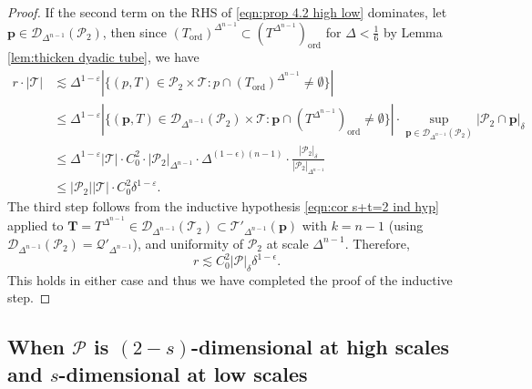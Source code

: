 \documentclass{amsart}
\newtheorem{definition}[prop]{Definition}
\newcommand{\T}{\mathcal{T}}
\newcommand{\eps}{\varepsilon}
\newcommand{\lesim}{\lesssim}
\newcommand{\bp}{\mathbf{p}}
\newcommand{\bT}{\mathbf{T}}
\newcommand{\cD}{\mathcal{D}}
\newcommand{\cL}{\mathcal{L}}
\newcommand{\cT}{\mathcal{T}}
\newcommand{\cQ}{\mathcal{Q}}
\newcommand{\cP}{\mathcal{P}}
\newcommand{\ord}{\mathrm{ord}}
\begin{document}
\begin{proof}
If the second term on the RHS of \eqref{eqn:prop 4.2 high low} dominates, let $\bp\in \cD_{\Delta^{n-1}}(\cP_2)$, then since $(T_\ord)^{\Delta^{n-1}} \subset (T^{\Delta^{n-1}})_\ord$ for $\Delta < \frac{1}{6}$ by Lemma \ref{lem:thicken dyadic tube}, we have
\begin{align*}
    r \cdot |\cT| &\lesim \Delta^{1-\eps} |\{ (p, T)\in \cP_2 \times \cT: p \cap (T_\ord)^{\Delta^{n-1}}\neq \emptyset\}| \\
    &\le \Delta^{1-\eps} |\{ (\bp, T)\in \cD_{\Delta^{n-1}}(\cP_2)\times \cT: \bp\cap (T^{\Delta^{n-1}})_\ord \neq \emptyset\}| \cdot \sup_{\bp \in \cD_{\Delta^{n-1}} (\cP_2)}|\cP_2 \cap \bp|_\delta \\
    &\le \Delta^{1-\eps} |\T| \cdot C_0^2 \cdot |\cP_2|_{\Delta^{n-1}}  \cdot \Delta^{(1-\epsilon)(n-1)} \cdot \frac{|\cP_2|_\delta}{|\cP_2|_{\Delta^{n-1}}} \\
    &\le |\cP_2| |\cT| \cdot C_0^2 \delta^{1-\eps}.
\end{align*}
The third step follows from the inductive hypothesis \eqref{eqn:cor s+t=2 ind hyp} applied to $\bT = T^{\Delta^{n-1}} \in \cD_{\Delta^{n-1}} (\T_2) \subset \T'_{\Delta^{n-1}} (\bp)$ with $k = n-1$ (using $\cD_{\Delta^{n-1}} (\cP_2) = \cQ'_{\Delta^{n-1}}$), and uniformity of $\cP_2$ at scale $\Delta^{n-1}$.
Therefore, 
\[
r \lesssim C_0^2 |\cP|_{\delta} \delta^{1-\epsilon}.
\]
This holds in either case and thus we have completed the proof of the inductive step.

\end{proof}
\subsection{When $\cP$ is $(2-s)$-dimensional at high scales and $s$-dimensional at low scales}

\end{document}
